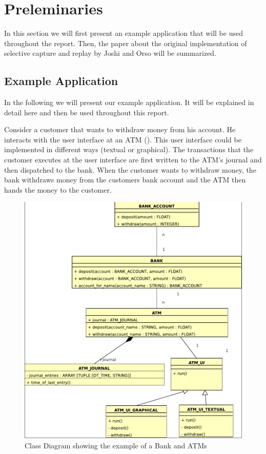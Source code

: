 \chapter{Preleminaries}
In this section we will first present an example application that will be used throughout the report. Then, the paper about the original implementation of selective capture and replay by Joshi and Orso \cite{orso05may} will be summarized.


\section{Example Application}
In the following we will present our example application. It will be explained in detail here and then be used throughout this report.

Consider a customer that wants to withdraw money from his account. He interacts with the user interface at an ATM (). This user interface could be implemented in different ways (textual or graphical). The transactions that the customer executes at the user interface are first written to the ATM's journal and then dispatched to the bank. When the customer wants to withdraw money, the bank withdraws money from the customers bank account and the ATM then hands the money to the customer.
 \begin{figure}[ht]
   \centering
   \includegraphics[width=1\textwidth]{illustrations/example_class_diagram}
   \caption{Class Diagram showing the example of a Bank and ATMs}
   \label{fig:example_class_diagram}
\end{figure}

